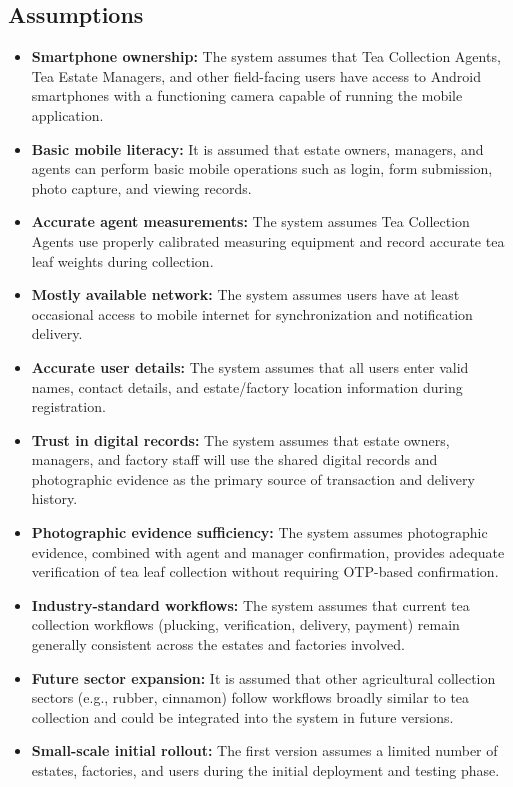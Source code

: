 \subsection{Assumptions}
\begin{itemize}
	\item \textbf{Smartphone ownership:} The system assumes that Tea Collection Agents, Tea Estate Managers, and other field-facing users have access to Android smartphones with a functioning camera capable of running the mobile application.
	\item \textbf{Basic mobile literacy:} It is assumed that estate owners, managers, and agents can perform basic mobile operations such as login, form submission, photo capture, and viewing records.
	\item \textbf{Accurate agent measurements:} The system assumes Tea Collection Agents use properly calibrated measuring equipment and record accurate tea leaf weights during collection.
	\item \textbf{Mostly available network:} The system assumes users have at least occasional access to mobile internet for synchronization and notification delivery.
	\item \textbf{Accurate user details:} The system assumes that all users enter valid names, contact details, and estate/factory location information during registration.
	\item \textbf{Trust in digital records:} The system assumes that estate owners, managers, and factory staff will use the shared digital records and photographic evidence as the primary source of transaction and delivery history.
	\item \textbf{Photographic evidence sufficiency:} The system assumes photographic evidence, combined with agent and manager confirmation, provides adequate verification of tea leaf collection without requiring OTP-based confirmation.
	\item \textbf{Industry-standard workflows:} The system assumes that current tea collection workflows (plucking, verification, delivery, payment) remain generally consistent across the estates and factories involved.
	\item \textbf{Future sector expansion:} It is assumed that other agricultural collection sectors (e.g., rubber, cinnamon) follow workflows broadly similar to tea collection and could be integrated into the system in future versions.
	\item \textbf{Small-scale initial rollout:} The first version assumes a limited number of estates, factories, and users during the initial deployment and testing phase.

\end{itemize}
